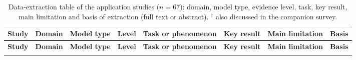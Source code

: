 \documentclass[10pt,a4paper]{article}
\begin{document}
\begin{landscape}
\footnotesize
\begin{longtable}{@{}P{3.0cm}P{2.2cm}P{2.1cm}P{0.6cm}P{4.2cm}P{4.6cm}P{4.4cm}P{1.0cm}@{}}
\caption{Data-extraction table of the application studies ($n = 67$): domain, model type, evidence level, task, key result, main limitation and basis of extraction (full text or abstract). $^\dagger$ also discussed in the companion survey.}\label{tab:S1}\\
\toprule
\textbf{Study} & \textbf{Domain} & \textbf{Model type} & \textbf{Level} & \textbf{Task or phenomenon} & \textbf{Key result} & \textbf{Main limitation} & \textbf{Basis} \\ \midrule
\endfirsthead
\toprule
\textbf{Study} & \textbf{Domain} & \textbf{Model type} & \textbf{Level} & \textbf{Task or phenomenon} & \textbf{Key result} & \textbf{Main limitation} & \textbf{Basis} \\ \midrule
\endhead
\bottomrule
\endfoot


\end{longtable}
\end{landscape}
\end{document}
